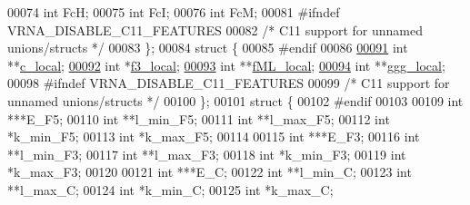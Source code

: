 \begin{DoxyCode}
00074       \textcolor{keywordtype}{int}     FcH;
00075       \textcolor{keywordtype}{int}     FcI;
00076       \textcolor{keywordtype}{int}     FcM;
00081 \textcolor{preprocessor}{#ifndef VRNA\_DISABLE\_C11\_FEATURES}
00082     \textcolor{comment}{/* C11 support for unnamed unions/structs */}
00083     \};
00084     \textcolor{keyword}{struct }\{
00085 \textcolor{preprocessor}{#endif}
00086 
\hypertarget{dp__matrices_8h_source.tex_l00091}{}\hyperlink{group__dp__matrices_a116c677ece0832e6ab9cc2fd1ebfe452}{00091}       \textcolor{keywordtype}{int}     **\hyperlink{group__dp__matrices_a116c677ece0832e6ab9cc2fd1ebfe452}{c\_local};    
\hypertarget{dp__matrices_8h_source.tex_l00092}{}\hyperlink{group__dp__matrices_a6eae0a2b696b0c63bbaa78a70b950600}{00092}       \textcolor{keywordtype}{int}     *\hyperlink{group__dp__matrices_a6eae0a2b696b0c63bbaa78a70b950600}{f3\_local};    
\hypertarget{dp__matrices_8h_source.tex_l00093}{}\hyperlink{group__dp__matrices_ad37d705240a8e6b1e9a4e4ea19e74003}{00093}       \textcolor{keywordtype}{int}     **\hyperlink{group__dp__matrices_ad37d705240a8e6b1e9a4e4ea19e74003}{fML\_local};  
\hypertarget{dp__matrices_8h_source.tex_l00094}{}\hyperlink{group__dp__matrices_afd3ea65bc8f06559f7f1ea79072fa385}{00094}       \textcolor{keywordtype}{int}     **\hyperlink{group__dp__matrices_afd3ea65bc8f06559f7f1ea79072fa385}{ggg\_local};  
00098 \textcolor{preprocessor}{#ifndef VRNA\_DISABLE\_C11\_FEATURES}
00099     \textcolor{comment}{/* C11 support for unnamed unions/structs */}
00100     \};
00101     \textcolor{keyword}{struct }\{
00102 \textcolor{preprocessor}{#endif}
00103 
00109       \textcolor{keywordtype}{int}             ***E\_F5;
00110       \textcolor{keywordtype}{int}             **l\_min\_F5;
00111       \textcolor{keywordtype}{int}             **l\_max\_F5;
00112       \textcolor{keywordtype}{int}             *k\_min\_F5;
00113       \textcolor{keywordtype}{int}             *k\_max\_F5;
00114 
00115       \textcolor{keywordtype}{int}             ***E\_F3;
00116       \textcolor{keywordtype}{int}             **l\_min\_F3;
00117       \textcolor{keywordtype}{int}             **l\_max\_F3;
00118       \textcolor{keywordtype}{int}             *k\_min\_F3;
00119       \textcolor{keywordtype}{int}             *k\_max\_F3;
00120 
00121       \textcolor{keywordtype}{int}             ***E\_C;
00122       \textcolor{keywordtype}{int}             **l\_min\_C;
00123       \textcolor{keywordtype}{int}             **l\_max\_C;
00124       \textcolor{keywordtype}{int}             *k\_min\_C;
00125       \textcolor{keywordtype}{int}             *k\_max\_C;

\end{DoxyCode}

